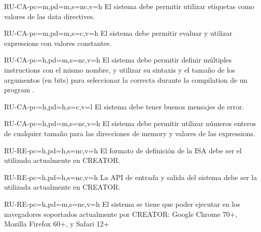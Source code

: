 \begin{userReq}{RU-CA-}{pc=m,pd=m,s=nc,v=h}
    El sistema debe permitir utilizar etiquetas como valores de las \glspl{data directive}.
\end{userReq}

\begin{userReq}{RU-CA-}{pc=m,pd=m,s=c,v=h}
    El sistema debe permitir evaluar y utilizar \glspl{expression} con valores
    constantes.
\end{userReq}

\begin{userReq}{RU-CA-}{pc=h,pd=m,s=nc,v=h}
    El sistema debe permitir definir múltiples \glspl{instruction} con el mismo
    nombre, y utilizar su sintaxis y el tamaño de los argumentos (en bits) para
    seleccionar la correcta durante la \gls{compilation} de un \gls{program}
    .
\end{userReq}

\begin{userReq}{RU-CA-}{pc=h,pd=h,s=c,v=l}
    El sistema debe tener buenos mensajes de error.
\end{userReq}

\begin{userReq}{RU-CA-}{pc=h,pd=m,s=nc,v=h}
    El sistema debe permitir utilizar números enteros de cualquier tamaño para
    las direcciones de \gls{memory} y valores de las \glspl{expression}.
\end{userReq}


\setcounter{i}{1}

\begin{userReq}{RU-RE-}{pc=h,pd=h,s=nc,v=h}
    El formato de definición de la \gls{ISA} debe ser el utilizado
    actualmente en CREATOR.
\end{userReq}

\begin{userReq}{RU-RE-}{pc=h,pd=h,s=nc,v=h}
    La \gls{API} de entrada y salida del sistema debe ser la utilizada
    actualmente en CREATOR.
\end{userReq}

\begin{userReq}{RU-RE-}{pc=h,pd=m,s=nc,v=h}
    El sistema se tiene que poder ejecutar en los navegadores soportados
    actualmente por CREATOR: Google Chrome 70+, Mozilla Firefox 60+, y Safari
    12+
\end{userReq}

